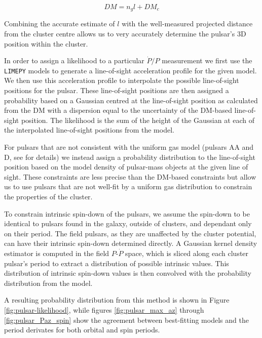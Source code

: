 \begin{equation}
    DM = n_g l + DM_c
    \label{eq:DM-los}
\end{equation}

Combining the accurate estimate of $l$ with the well-measured projected distance from the cluster
centre allows us to very accurately determine the pulsar's 3D position within the cluster.

In order to assign a likelihood to a particular $\dot{P}/P$ measurement we first use the
\texttt{LIMEPY} models to generate a line-of-sight acceleration profile for the given model. We then
use this acceleration profile to interpolate the possible line-of-sight positions for the pulsar.
These line-of-sight positions are then assigned a probability based on a Gaussian centred at the
line-of-sight position as calculated from the DM with a dispersion equal to the uncertainty of the
DM-based line-of-sight position. The likelihood is the sum of the height of the Gaussian at each of
the interpolated line-of-sight positions from the model.


For pulsars that are not consistent with the uniform gas model (pulsars AA and D, see
\citealt{Abbate2018} for details) we instead assign a probability distribution to the line-of-sight
position based on the model density of pulsar-mass objects at the given line of sight. These
constraints are less precise than the DM-based constraints but allow us to use pulsars that are not
well-fit by a uniform gas distribution to constrain the properties of the cluster.

To constrain intrinsic spin-down of the pulsars, we assume the spin-down to be identical to pulsars
found in the galaxy, outside of clusters, and dependant only on their period. The field pulsars, as
they are unaffected by the cluster potential, can have their intrinsic spin-down determined
directly. A Gaussian kernel density estimator is computed in the field $P$-$\dot{P}$ space, which is
sliced along each cluster pulsar's period to extract a distribution of possible intrinsic values.
This distribution of intrinsic spin-down values is then convolved with the probability distribution
from the model.

A resulting probability distribution from this method is shown in Figure
\ref{fig:pulsar-likelihood}, while figures \ref{fig:pulsar_max_az} through \ref{fig:pulsar_Paz_spin}
show the agreement between best-fitting models and the period derivates for both orbital and spin
periods.

